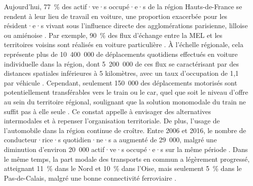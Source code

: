 \begin{refsegment}
Aujourd’hui, 77~\% des actif·ve·s occupé·e·s de la région Hauts-de-France se rendent à leur lieu de travail en voiture, une proportion exacerbée pour les résident·e·s vivant sous l’influence directe des agglomérations parisienne, lilloise ou amiénoise \textcolor{blue}{\autocite[52]{ceser_hauts-de-france_mobilite_2021}}. Par exemple, 90~\% des flux d'échange entre la \acrshort{MEL} et les territoires voisins sont réalisés en voiture particulière \textcolor{blue}{\autocite[171]{region_hauts-de-france_sraddet_2024}}. À l'échelle régionale, cela représente plus de 10~400~000 de déplacements quotidiens effectués en voiture individuelle dans la région, dont 5~200~000 de ces flux se caractérisant par des distances spatiales inférieures à 5 kilomètres, avec un taux d'occupation de 1,1 par véhicule \textcolor{blue}{\autocite[171]{region_hauts-de-france_sraddet_2024}}. Cependant, seulement 150~000 des déplacements motorisés sont potentiellement transférables vers le train ou le car, quel que soit le niveau d’offre au sein du territoire régional, soulignant que la solution monomodale du train ne suffit pas à elle seule \textcolor{blue}{\autocite[7-8]{observatoire_des_territoires_se_2019}}. Ce constat appelle à envisager des alternatives intermodales et à repenser l’organisation territoriale. De plus, l’usage de l’automobile dans la région continue de croître. Entre 2006 et 2016, le nombre de conducteur·rice·s quotidien·ne·s a augmenté de 29~000, malgré une diminution d’environ 20~000 actif·ve·s occupé·e·s sur la même période \textcolor{blue}{\autocite[58]{ceser_hauts-de-france_mobilite_2021}}. Dans le même temps, la part modale des transports en commun a légèrement progressé, atteignant 11~\% dans le Nord et 10~\% dans l’Oise, mais seulement 5~\% dans le Pas-de-Calais, malgré une bonne connectivité ferroviaire \textcolor{blue}{\autocite[58]{ceser_hauts-de-france_mobilite_2021}}.%


\end{refsegment}
